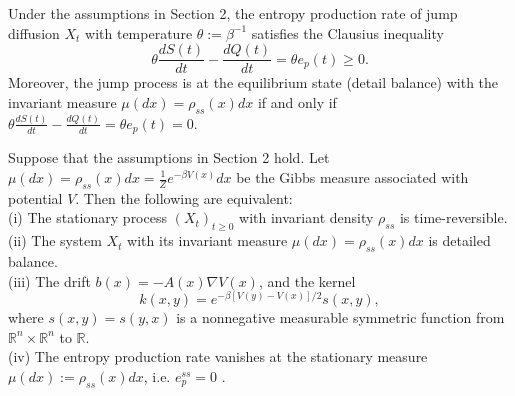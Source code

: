 \documentclass[10pt,a4paper]{amsart}
\begin{document}
\begin{thm}\label{SecondL}
Under the assumptions in Section 2, the entropy production rate of jump diffusion $X_t$ with temperature $\theta := \beta^{-1}$ satisfies the Clausius inequality
\begin{equation*}
   \theta\frac{dS(t)}{dt} -\frac{dQ(t)}{dt} = \theta e_{p}(t) \geq 0.
\end{equation*}
Moreover, the jump process is at the equilibrium state (detail balance) with the invariant measure $\mu(dx) = \rho_{ss}(x)dx$ if and only if $\theta\frac{dS(t)}{dt} - \frac{dQ(t)}{dt} = \theta e_p(t) = 0$.
\end{thm}

\begin{thm}\label{TSeq}
Suppose that the assumptions in Section 2 hold.
Let $\mu(dx) = \rho_{ss}(x)dx = \frac{1}{Z} e^{-\beta V(x)}dx$ be the Gibbs measure associated with potential $V$.
Then the following are equivalent: \\
(i) The stationary process $(X_t)_{t\geq 0}$ with invariant density $\rho_{ss}$ is time-reversible.\\
(ii) The system $X_t$ with its invariant measure $\mu(dx)=\rho_{ss}(x)dx$ is detailed balance.\\
(iii) The drift $b(x) = -A(x)\nabla V(x)$, and the kernel
\begin{equation*}
    k(x,y) = e^{-\beta[V(y)-V(x)]/2} s(x,y),
\end{equation*}
where $s(x,y) = s(y,x)$ is a nonnegative measurable symmetric function from $\mathbb{R}^n \times \mathbb{R}^n$ to $\mathbb{R}$.\\
(iv) The entropy production rate vanishes at the stationary measure $\mu(dx) :=\rho_{ss}(x)dx$, i.e. $e^{ss}_{p} = 0$ .
\end{thm}
\end{document}

